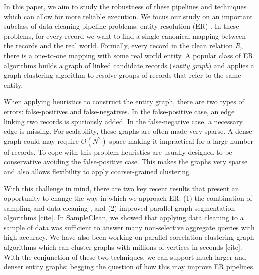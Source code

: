 In this paper, we aim to study the robustness of these pipelines and techniques which can allow for more reliable execution.
We focus our study on an important subclass of data cleaning pipeline problems: entity resolution (ER) \cite{DBLP:journals/pvldb/KopckeTR10, conf/dmkd/MongeE97, conf/sigmod/WhangMKTG09, conf/acl/FinkelM08, conf/sigmod/WangLF12, Fellegi1969, conf/sigmod/ArasuGK10, DBLP:journals/tkde/ElmagarmidIV07, journals/tkde/Christen11, getoor2005link}. 
In these problems, for every record we want to find a single canonical mapping between the records and the real world.
Formally, every record in the clean relation $R_c$ there is a one-to-one mapping with some real world entity.
A popular class of ER algorithms builds a graph of linked candidate records (\emph{entity graph}) \cite{bhattacharya2005relational, wang1999sample} and applies a graph clustering algorithm to resolve groups of records that refer to the same entity.

When applying heuristics to construct the entity graph, there are two types of errors: false-positives and false-negatives. 
In the false-positive case, an edge linking two records is spuriously added. 
In the false-negative case, a necessary edge is missing. 
For scalability, these graphs are often made very sparse.
A dense graph could may require $O(N^2)$ space making it impractical for a large number of records.
To cope with this problem heuristics are usually designed to be conservative avoiding the false-positive case.
This makes the graphs very sparse and also allows flexibility to apply coarser-grained clustering.

With this challenge in mind, there are two key recent results that present an opportunity to change the way in which we approach ER: (1) the combination of sampling and data cleaning \cite{wang1999sample}, and (2) improved parallel graph segmentation algorithms [cite]. 
In SampleClean, we showed that applying data cleaning to a sample of data was sufficient to answer many non-selective aggregate queries with high accuracy. We have also been working on parallel correlation clustering graph algorithms which can cluster graphs with millions of vertices in seconds [cite].
With the conjunction of these two techniques, we can support much larger and denser entity graphs; begging the question of how this may improve ER pipelines.

